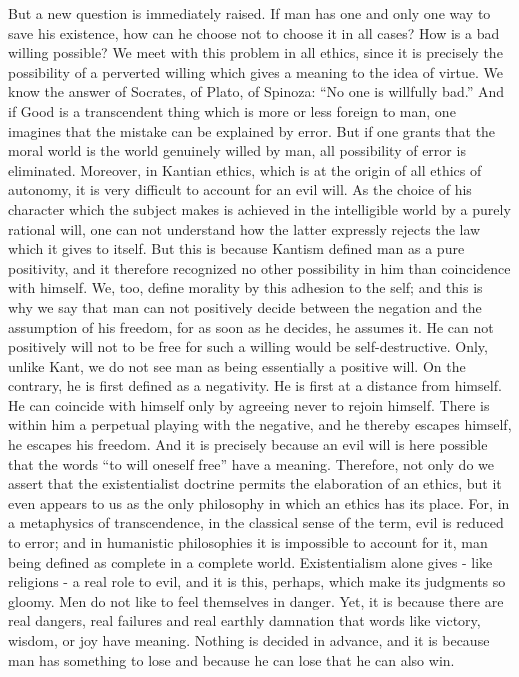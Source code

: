 \documentclass[11pt]{article}
\begin{document}
But a new question is immediately raised. If man has one and only one way to save his existence, how can he choose not to choose it in all cases? How is a bad willing possible? We meet with this problem in all ethics, since it is precisely the possibility of a perverted willing which gives a meaning to the idea of virtue. We know the answer of Socrates, of Plato, of Spinoza: “No one is willfully bad.” And if Good is a transcendent thing which is more or less foreign to man, one imagines that the mistake can be explained by error. But if one grants that the moral world is the world genuinely willed by man, all possibility of error is eliminated. Moreover, in Kantian ethics, which is at the origin of all ethics of autonomy, it is very difficult to account for an evil will. As the choice of his character which the subject makes is achieved in the intelligible world by a purely rational will, one can not understand how the latter expressly rejects the law which it gives to itself. But this is because Kantism defined man as a pure positivity, and it therefore recognized no other possibility in him than coincidence with himself. We, too, define morality by this adhesion to the self; and this is why we say that man can not positively decide between the negation and the assumption of his freedom, for as soon as he decides, he assumes it. He can not positively will not to be free for such a willing would be self-destructive. Only, unlike Kant, we do not see man as being essentially a positive will. On the contrary, he is first defined as a negativity. He is first at a distance from himself. He can coincide with himself only by agreeing never to rejoin himself. There is within him a perpetual playing with the negative, and he thereby escapes himself, he escapes his freedom. And it is precisely because an evil will is here possible that the words “to will oneself free” have a meaning. Therefore, not only do we assert that the existentialist doctrine permits the elaboration of an ethics, but it even appears to us as the only philosophy in which an ethics has its place. For, in a metaphysics of transcendence, in the classical sense of the term, evil is reduced to error; and in humanistic philosophies it is impossible to account for it, man being defined as complete in a complete world. Existentialism alone gives - like religions - a real role to evil, and it is this, perhaps, which make its judgments so gloomy. Men do not like to feel themselves in danger. Yet, it is because there are real dangers, real failures and real earthly damnation that words like victory, wisdom, or joy have meaning. Nothing is decided in advance, and it is because man has something to lose and because he can lose that he can also win.
\end{document}
